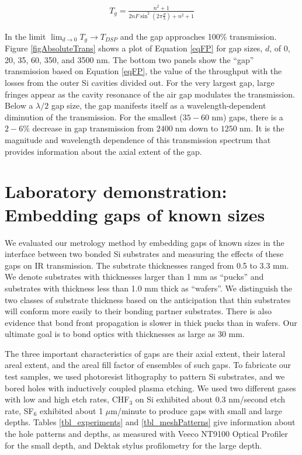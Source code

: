 \begin{eqnarray}
T_{g} = \frac{n^2+1}{2 n F \sin ^2(2\pi \frac{d}{\lambda})+n^2+1} \label{eqFP}
\end{eqnarray}

In the limit $\lim_{d \to 0} T_g \rightarrow T_{DSP} $ and the gap approaches 100\% transmission.  Figure \ref{figAbsoluteTrans} shows a plot of Equation \ref{eqFP} for gap sizes, $d$, of 0, 20, 35, 60, 350, and 3500 nm.  The bottom two panels show the ``gap'' transmission based on Equation \ref{eqFP}, the value of the throughput with the losses from the outer Si cavities divided out.  For the very largest gap, large fringes appear as the cavity resonance of the air gap modulates the transmission.  Below a $\lambda/2$ gap size, the gap manifests itself as a wavelength-dependent diminution of the transmission.  For the smallest ($35-60$ nm) gaps, there is a $2-6\%$ decrease in gap transmission from $2400\;$nm down to $1250\;$nm.  It is the magnitude and wavelength dependence of this transmission spectrum that provides information about the axial extent of the gap.

\section{Laboratory demonstration: Embedding gaps of known sizes}

We evaluated our metrology method by embedding gaps of known sizes in the interface between two bonded Si substrates and measuring the effects of these gaps on IR transmission.  The substrate thicknesses ranged from 0.5 to 3.3 mm.  We denote substrates with thicknesses larger than 1 mm as ``pucks'' and substrates with thickness less than 1.0 mm thick as ``wafers''.  We distinguish the two classes of substrate thickness based on the anticipation that thin substrates will conform more easily to their bonding partner substrates.  There is also evidence that bond front propagation is slower in thick pucks \cite{2007ApOpt..46.6793H} than in wafers.  Our ultimate goal is to bond optics with thicknesses as large as 30 mm.

The three important characteristics of gaps are their axial extent, their lateral areal extent, and the areal fill factor of ensembles of such gaps.  To fabricate our test samples, we used photoresist lithography to pattern Si substrates, and we bored holes with inductively coupled plasma etching.  We used two different gases with low and high etch rates, CHF$_3$ on Si exhibited about 0.3 nm/second etch rate, SF$_6$ exhibited about 1 $\mu$m/minute to produce gaps with small and large depths.  Tables \ref{tbl_experiments} and \ref{tbl_meshPatterns} give information about the hole patterns and depths, as measured with Veeco NT9100 Optical Profiler for the small depth, and Dektak stylus profilometry for the large depth.

